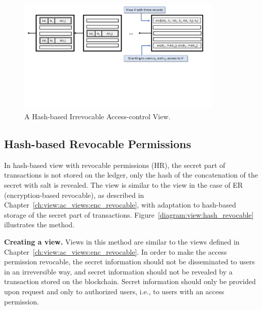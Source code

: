 \begin{figure}[t]
    \centering
    \includegraphics[trim=0 220 0 0, clip,width=0.87\textwidth]{diagram/view/hash_irrevocable.png}
    \caption{A Hash-based Irrevocable Access-control View.}
    \label{diagram:view:hash_irrevocable}
\end{figure}


\subsection{Hash-based Revocable Permissions}
\label{ch:view:ac_views:hash_revocable}

In hash-based view with revocable permissions (HR), 
the secret part of transactions is not stored on the ledger, only the hash of the concatenation of the secret with salt is revealed. The view is similar to the view in the case of ER (encryption-based revocable), as described in Chapter~\ref{ch:view:ac_views:enc_revocable}, with adaptation to hash-based storage of the secret part of transactions. Figure~\ref{diagram:view:hash_revocable} illustrates the method.

\medskip
\noindent
\textbf{Creating a view.}
Views in this method are similar to the views defined in Chapter~\ref{ch:view:ac_views:enc_revocable}. In order to make the access permission revocable, the secret information should not be disseminated to users in an irreversible way, and secret information should not be revealed by a transaction stored on the blockchain. Secret information should only be provided upon request and only to authorized users, i.e., to users with an access permission.

